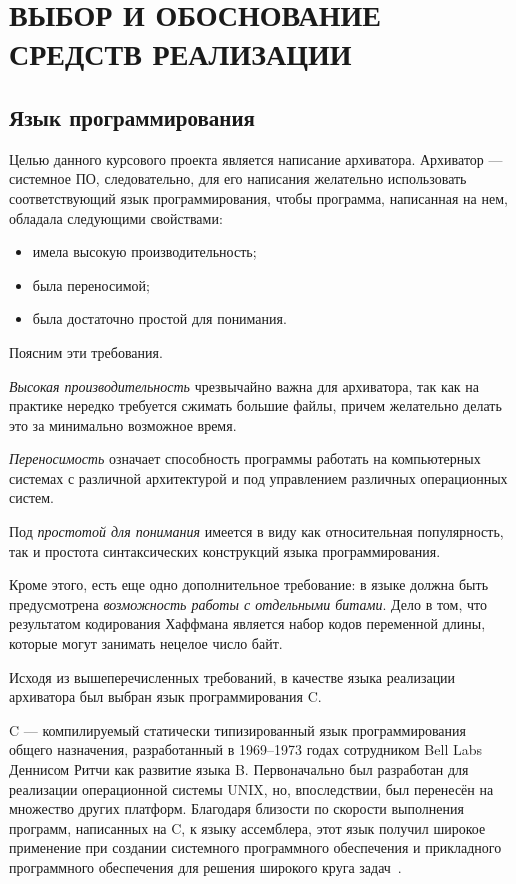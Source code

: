 \section[Выбор и обоснование средств реализации]{ВЫБОР И ОБОСНОВАНИЕ \\ СРЕДСТВ РЕАЛИЗАЦИИ}
\label{sec:choice}

\subsection{Язык программирования}

Целью данного курсового проекта является написание архиватора.
Архиватор --- системное ПО, следовательно, для его написания желательно
использовать соответствующий язык программирования, 
чтобы программа, написанная на нем, обладала следующими свойствами:

\begin{itemize}
\item имела высокую производительность;
\item была переносимой;
\item была достаточно простой для понимания.
\end{itemize}

Поясним эти требования.

\textit{Высокая производительность} чрезвычайно важна для архиватора,
так как на практике нередко требуется сжимать большие файлы,
причем желательно делать это за минимально возможное время.

\textit{Переносимость} означает способность программы работать на
компьютерных системах с различной архитектурой и под управлением 
различных операционных систем.

Под \textit{простотой для понимания} имеется в виду как относительная 
популярность, так и простота синтаксических конструкций языка программирования.

Кроме этого, есть еще одно дополнительное требование:
в языке должна быть предусмотрена \textit{возможность работы с отдельными битами}.
Дело в том, что результатом кодирования Хаффмана является набор кодов 
переменной длины, которые могут занимать нецелое число байт. 

Исходя из вышеперечисленных требований, в качестве языка реализации
архиватора был выбран язык программирования C.

C --- компилируемый статически типизированный язык программирования общего
назначения, разработанный в 1969--1973 годах сотрудником Bell Labs
Деннисом Ритчи как развитие языка B.
Первоначально был разработан для реализации операционной системы UNIX,
но, впоследствии, был перенесён на множество других платформ.
Благодаря близости по скорости выполнения программ, написанных на C,
к языку ассемблера, этот язык получил широкое применение при создании
системного программного обеспечения и прикладного программного
обеспечения для решения широкого круга задач~\cite{wiki_c}.

